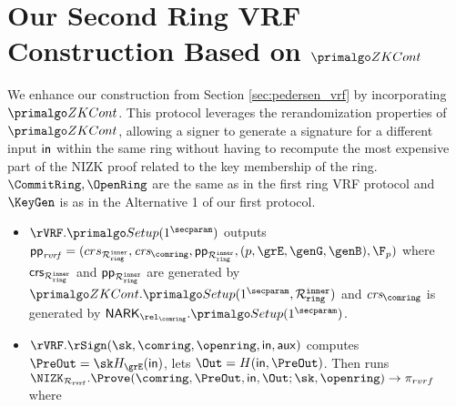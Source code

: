 
\section{Our Second Ring VRF Construction Based on $ \ZKCont $}
\label{subsec:rvrf_faster}
We enhance our construction from Section \ref{sec:pedersen_vrf} by incorporating $ \ZKCont $. This protocol leverages the rerandomization properties of $ \ZKCont $, allowing a signer to generate a signature for a different input $ \mathsf{in} $ within the same ring without having to recompute the most expensive part of the NIZK proof related to the key membership of the ring. $\CommitRing, \OpenRing $ are the same as in the first ring VRF protocol and $ \KeyGen$ is as in the Alternative 1 of our first protocol.
\begin{itemize}
	\item $ \rVRF.\Setup(1^\secparam)   $ outputs $ \pprvrf = (crs_{\relinner}, \crsnark,  \pp_{\relinner}, (p, \grE,\genG, \genB), \F_p) $ where $ \mathsf{crs}_{\mathcal{R}_{\mathtt{ring}}^{\mathtt{inner}}}$ and $\mathsf{pp}_{\mathcal{R}_{\mathtt{ring}}^{\mathtt{inner}}} $ are generated by $ \ZKCont.\Setup(1^\secparam, \relinner) $ and $ \crsnark $ is generated by $ \NARK_{\relcomring}.\Setup(1^\secparam) $.
	
	\item $\rVRF.\rSign(\sk,\comring, \openring,\msg,\aux) $ computes $ \PreOut = \sk H_\grE(\msg) $, lets $ \Out = H(\msg, \allowbreak \PreOut) $. Then runs $ \NIZK_{\relrvrf}.\Prove(\comring, \allowbreak \PreOut, \allowbreak \msg, \allowbreak \Out; \sk,\openring)\rightarrow \pi_{rvrf}$ where
	

\end{itemize}
